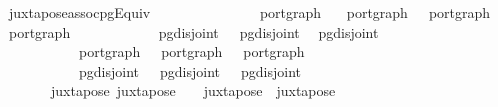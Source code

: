 \ juxtapose{\isacharunderscore}assoc{\isacharunderscore}pgEquiv{\isacharcolon}\isanewline
\ \ \ \ \ \ \ \ \ \ {\isacharcolon}{\isacharcolon}\ {\isachardoublequoteopen}{\isacharparenleft}\ \ \ \ port{\isacharunderscore}graph{\isachardoublequoteclose}\isanewline
\ \ \ {\isachardoublequoteopen}port{\isacharunderscore}graph\ \ \ {\isachardoublequoteopen}port{\isacharunderscore}graph\  \ {\isachardoublequoteopen}port{\isacharunderscore}graph\ \isanewline
\ \ \ \ \ \ \ \ \ \ \ {\isachardoublequoteopen}pg{\isacharunderscore}disjoint\ \ \ {\isachardoublequoteopen}pg{\isacharunderscore}disjoint\  \ {\isachardoublequoteopen}pg{\isacharunderscore}disjoint\ \isanewline
\ \ \ \ \ \ \ \ \ \ \ {\isachardoublequoteopen}port{\isacharunderscore}graph\ \ \ {\isachardoublequoteopen}port{\isacharunderscore}graph\ \ \ {\isachardoublequoteopen}port{\isacharunderscore}graph\ \isanewline
\ \ \ \ \ \ \ \ \ \ \ {\isachardoublequoteopen}pg{\isacharunderscore}disjoint\ \ \ {\isachardoublequoteopen}pg{\isacharunderscore}disjoint\ \ \ {\isachardoublequoteopen}pg{\isacharunderscore}disjoint\ \isanewline
\ \ \ \ \ \ \ \ \ \ \ {\isachardoublequoteopen}\ {\isasymapprox}\ \ \ {\isachardoublequoteopen}\ {\isasymapprox}\ \ \ {\isachardoublequoteopen}\ {\isasymapprox}\ \isanewline
\ \ \ \ \ \ \ {\isachardoublequoteopen}juxtapose\ {\isacharparenleft}juxtapose\ \ \ {\isasymapprox}\ juxtapose\ \ {\isacharparenleft}juxtapose\ 
